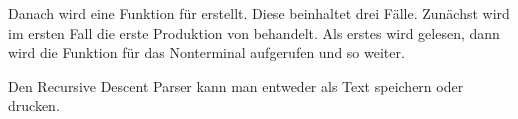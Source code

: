 Danach wird eine Funktion für  erstellt. Diese beinhaltet drei Fälle. Zunächst wird im ersten Fall die erste Produktion von  behandelt. Als erstes wird  gelesen, dann wird die Funktion für das Nonterminal  aufgerufen und so weiter.

Den Recursive Descent Parser kann man entweder als Text speichern oder drucken.
